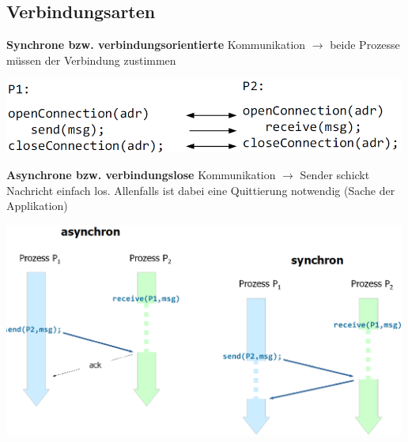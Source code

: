 \documentclass{report}
\newenvironment{Figure}
	{\par\medskip\noindent\minipage{\linewidth}}
	{\endminipage\par\medskip}
\theoremstyle{definition}
\theoremstyle{example}
\begin{document}
	\subsection{Verbindungsarten}
\textbf{Synchrone bzw. verbindungsorientierte} Kommunikation $\rightarrow$ beide Prozesse müssen der Verbindung zustimmen
\begin{Figure}
\centering
\includegraphics[width=500px]{img/MessagePassingSynchron.png}
	\label{fig:Beispiel einer synchronenMessage Passing}
\end{Figure}

\textbf{Asynchrone bzw. verbindungslose} Kommunikation $\rightarrow$ Sender schickt Nachricht einfach los. Allenfalls ist dabei eine Quittierung notwendig (Sache der Applikation)
\begin{Figure}
\centering
\includegraphics[width=500px]{img/MessagePassingSynchronAsynchron.png}
	\label{fig:Unterschied synchron vs. asynchrones Message Passing}
\end{Figure}
\end{document}
